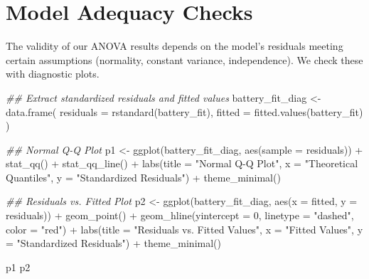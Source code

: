 \documentclass[
  letterpaper,
]{scrbook}
\newenvironment{Shaded}{\begin{snugshade}}{\end{snugshade}}
\newcommand{\AttributeTok}[1]{\textcolor[rgb]{0.40,0.45,0.13}{#1}}
\newcommand{\DecValTok}[1]{\textcolor[rgb]{0.68,0.00,0.00}{#1}}
\newcommand{\DocumentationTok}[1]{\textcolor[rgb]{0.37,0.37,0.37}{\textit{#1}}}
\newcommand{\FunctionTok}[1]{\textcolor[rgb]{0.28,0.35,0.67}{#1}}
\newcommand{\NormalTok}[1]{\textcolor[rgb]{0.00,0.23,0.31}{#1}}
\newcommand{\OtherTok}[1]{\textcolor[rgb]{0.00,0.23,0.31}{#1}}
\newcommand{\SpecialCharTok}[1]{\textcolor[rgb]{0.37,0.37,0.37}{#1}}
\newcommand{\StringTok}[1]{\textcolor[rgb]{0.13,0.47,0.30}{#1}}
\begin{document}
\section{Model Adequacy Checks}\label{model-adequacy-checks-1}

The validity of our ANOVA results depends on the model's residuals
meeting certain assumptions (normality, constant variance,
independence). We check these with diagnostic plots.

\begin{Shaded}
\begin{Highlighting}[]
\DocumentationTok{\#\# Extract standardized residuals and fitted values}
\NormalTok{battery\_fit\_diag }\OtherTok{\textless{}{-}} \FunctionTok{data.frame}\NormalTok{(}
  \AttributeTok{residuals =} \FunctionTok{rstandard}\NormalTok{(battery\_fit),}
  \AttributeTok{fitted =} \FunctionTok{fitted.values}\NormalTok{(battery\_fit)}
\NormalTok{)}

\DocumentationTok{\#\# Normal Q{-}Q Plot}
\NormalTok{p1 }\OtherTok{\textless{}{-}} \FunctionTok{ggplot}\NormalTok{(battery\_fit\_diag, }\FunctionTok{aes}\NormalTok{(}\AttributeTok{sample =}\NormalTok{ residuals)) }\SpecialCharTok{+}
  \FunctionTok{stat\_qq}\NormalTok{() }\SpecialCharTok{+}
  \FunctionTok{stat\_qq\_line}\NormalTok{() }\SpecialCharTok{+}
  \FunctionTok{labs}\NormalTok{(}\AttributeTok{title =} \StringTok{"Normal Q{-}Q Plot"}\NormalTok{, }\AttributeTok{x =} \StringTok{"Theoretical Quantiles"}\NormalTok{, }\AttributeTok{y =} \StringTok{"Standardized Residuals"}\NormalTok{) }\SpecialCharTok{+}
  \FunctionTok{theme\_minimal}\NormalTok{()}

\DocumentationTok{\#\# Residuals vs. Fitted Plot}
\NormalTok{p2 }\OtherTok{\textless{}{-}} \FunctionTok{ggplot}\NormalTok{(battery\_fit\_diag, }\FunctionTok{aes}\NormalTok{(}\AttributeTok{x =}\NormalTok{ fitted, }\AttributeTok{y =}\NormalTok{ residuals)) }\SpecialCharTok{+}
  \FunctionTok{geom\_point}\NormalTok{() }\SpecialCharTok{+}
  \FunctionTok{geom\_hline}\NormalTok{(}\AttributeTok{yintercept =} \DecValTok{0}\NormalTok{, }\AttributeTok{linetype =} \StringTok{"dashed"}\NormalTok{, }\AttributeTok{color =} \StringTok{"red"}\NormalTok{) }\SpecialCharTok{+}
  \FunctionTok{labs}\NormalTok{(}\AttributeTok{title =} \StringTok{"Residuals vs. Fitted Values"}\NormalTok{, }\AttributeTok{x =} \StringTok{"Fitted Values"}\NormalTok{, }\AttributeTok{y =} \StringTok{"Standardized Residuals"}\NormalTok{) }\SpecialCharTok{+}
  \FunctionTok{theme\_minimal}\NormalTok{()}

\NormalTok{p1 }
\NormalTok{p2}
\end{Highlighting}
\end{Shaded}
\end{document}
